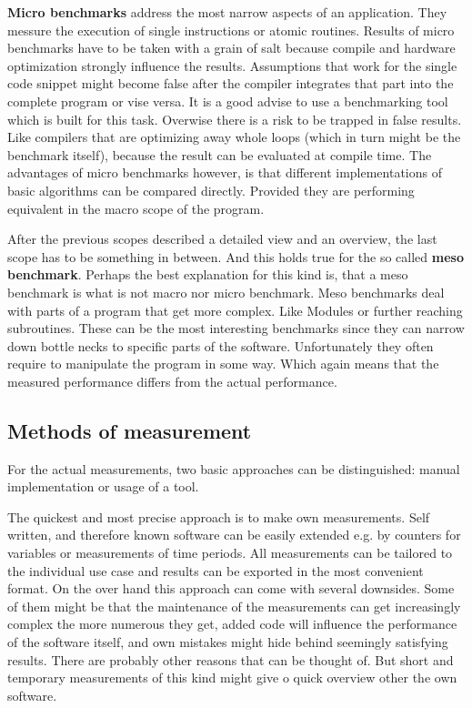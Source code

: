 \textbf{Micro benchmarks} address the most narrow aspects of an application. They messure the execution of single instructions or atomic routines. Results of micro benchmarks have to be taken with a grain of salt because compile and hardware optimization strongly influence the results. Assumptions that work for the single code snippet might become false after the compiler integrates that part into the complete program or vise versa. It is a good advise to use a benchmarking tool which is built for this task. Overwise there is a risk to be trapped in false results. Like compilers that are optimizing away whole loops (which in turn might be the benchmark itself), because the result can be evaluated at compile time. The advantages of micro benchmarks however, is that different implementations of basic algorithms can be compared directly. Provided they are performing equivalent in the macro scope of the program.

After the previous scopes described a detailed view and an overview, the last scope has to be something in between. And this holds true for the so called \textbf{meso benchmark}. Perhaps the best explanation for this kind is, that a meso benchmark is what is not macro nor micro benchmark. Meso benchmarks deal with parts of a program that get more complex. Like Modules or further reaching subroutines. These can be the most interesting benchmarks since they can narrow down bottle necks to specific parts of the software. Unfortunately they often require to manipulate the program in some way. Which again means that the measured performance differs from the actual performance.


\subsection{Methods of measurement}
\label{BenchMethods}
For the actual measurements, two basic approaches can be distinguished: manual implementation or usage of a tool.

The quickest and most precise approach is to make own measurements. Self written, and therefore known software can be easily extended e.g. by counters for variables or measurements of time periods. All measurements can be tailored to the individual use case and results can be exported in the most convenient format. On the over hand this approach can come with several downsides. Some of them might be that the maintenance of the measurements can get increasingly complex the more numerous they get, added code will influence the performance of the software itself, and own mistakes might hide behind seemingly satisfying results. There are probably other reasons that can be thought of. But short and temporary measurements of this kind might give o quick overview other the own software.

